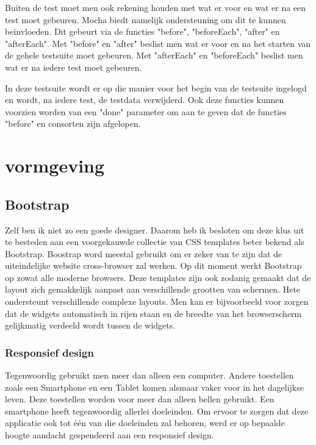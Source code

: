 \documentclass[a4paper,11pt]{article}
\begin{document}
Buiten de test moet men ook rekening houden met wat er voor en wat er na een test moet gebeuren. Mocha biedt namelijk ondersteuning om dit te kunnen beïnvloeden. Dit gebeurt via de functies "before", "beforeEach", "after" en "afterEach". Met "before" en "after" beslist men wat er voor en na het starten van de gehele testsuite moet gebeuren. Met "afterEach" en "beforeEach" beslist men wat er na iedere test moet gebeuren.

In deze testsuite wordt er op die manier voor het begin van de testsuite ingelogd en wordt, na iedere test, de testdata verwijderd. Ook deze functies kunnen voorzien worden van een "done" parameter om aan te geven dat de functies "before" en consorten zijn afgelopen.

\section{vormgeving}

\subsection{Bootstrap}
Zelf ben ik niet zo een goede designer. Daarom heb ik besloten om deze klus uit te besteden aan een voorgekauwde collectie van CSS templates beter bekend als Bootstrap. Boostrap word meestal gebruikt om er zeker van te zijn dat de uiteindelijke website cross-browser zal werken. Op dit moment werkt Bootstrap op zowat alle moderne browsers. Deze templates zijn ook zodanig gemaakt dat de layout zich gemakkelijk aanpast aan verschillende grootten van schermen. Hete ondersteunt verschillende complexe layouts. Men kan er bijvoorbeeld voor zorgen dat de widgets automatisch in rijen staan en de breedte van het browserscherm gelijkmatig verdeeld wordt tussen de widgets.

\subsubsection{Responsief design}
Tegenwoordig gebruikt men meer dan alleen een computer. Andere toestellen zoals een Smartphone en een Tablet komen alsmaar vaker voor in het dagelijkse leven. Deze toestellen worden voor meer dan alleen bellen gebruikt. Een smartphone heeft tegenwoordig allerlei doeleinden. Om ervoor te zorgen dat deze applicatie ook tot één van die doeleinden zal behoren, werd er op bepaalde hoogte aandacht gespendeerd aan een responsief design.
\end{document}

